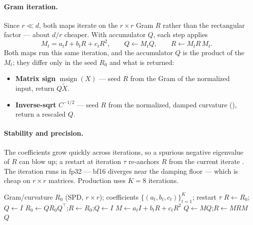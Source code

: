 \documentclass[11pt]{article}
\DeclareMathOperator{\polar}{msign}          %
\theoremstyle{plain}
\theoremstyle{definition}
\theoremstyle{remark}
\begin{document}
\paragraph{Gram iteration.} Since $r\ll d$, both maps iterate on the $r\times r$ Gram
$R$ rather than the rectangular factor \cite{gram_ns} --- about $d/r$ cheaper. With
accumulator $Q$, each step applies
\begin{equation*}
  M_t=a_t I+b_t R+c_t R^2,\qquad Q\gets M_t Q,\qquad R\gets M_t R\,M_t .
\end{equation*}
Both maps run this same iteration, and the accumulator $Q$ is the product of the $M_t$;
they differ only in the seed $R_0$ and what is returned:
\begin{itemize}[leftmargin=1.5em,itemsep=1pt,topsep=2pt]
  \item \textbf{Matrix sign} $\polar(X)$ --- seed $R$ from the Gram of the normalized input, return $Q\tilde X$.
  \item \textbf{Inverse-sqrt} $C^{-1/2}$ --- seed $R$ from the normalized, damped curvature (), return a rescaled $Q$.
\end{itemize}

\paragraph{Stability and precision.} The coefficients grow quickly across iterations,
so a spurious negative eigenvalue of $R$ can blow up; a restart at iteration $\tau$
re-anchors $R$ from the current iterate \cite{gram_ns}. The iteration runs in fp32 ---
bf16 diverges near the damping floor --- which is cheap on $r\times r$ matrices.
Production uses $K{=}8$ iterations.

\begin{algorithm}[h]
\caption{Gram Newton--Schulz (shared by $\polar$ and the inverse-sqrt)}
\label{alg:gramns}
\begin{algorithmic}[1]
\Require Gram/curvature $R_0$ (SPD, $r\times r$); coefficients $\{(a_t,b_t,c_t)\}_{t=1}^{K}$; restart $\tau$
\State $R\gets R_0$;\quad $Q\gets I$
   \State $R_0\gets Q R_0 Q^\top$;\quad $R\gets R_0$;\quad $Q\gets I$  \EndIf
  \State $M\gets a_t I+b_t R+c_t R^2$
  \State $Q\gets M Q$;\quad $R\gets M R M$
\EndFor
\State \Return $Q$ 
\end{algorithmic}
\end{algorithm}
\end{document}
